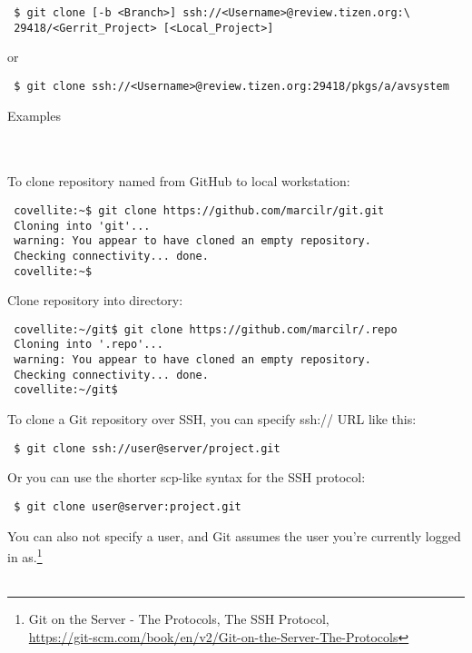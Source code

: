 \begin{Verbatim}
 $ git clone [-b <Branch>] ssh://<Username>@review.tizen.org:\
 29418/<Gerrit_Project> [<Local_Project>]
\end{Verbatim}

or

\begin{Verbatim}
 $ git clone ssh://<Username>@review.tizen.org:29418/pkgs/a/avsystem
\end{Verbatim}

\vspace{20pt}
\noindent\begin{bf}Examples\end{bf}
\\
\\
To clone repository named  from GitHub to local  workstation:
\begin{Verbatim}
 covellite:~$ git clone https://github.com/marcilr/git.git
 Cloning into 'git'...
 warning: You appear to have cloned an empty repository.
 Checking connectivity... done.
 covellite:~$
\end{Verbatim}

\noindent Clone  repository into  directory:
\begin{Verbatim}
 covellite:~/git$ git clone https://github.com/marcilr/.repo
 Cloning into '.repo'...
 warning: You appear to have cloned an empty repository.
 Checking connectivity... done.
 covellite:~/git$
\end{Verbatim}

\noindent To clone a Git repository over SSH, you can specify ssh:// URL like this:\\
\begin{Verbatim}
 $ git clone ssh://user@server/project.git
\end{Verbatim}

\noindent Or you can use the shorter scp-like syntax for the SSH protocol:

\begin{Verbatim}
 $ git clone user@server:project.git
\end{Verbatim}

\noindent You can also not specify a user, and Git assumes the user
you're currently logged in as.\footnote{
Git on the Server - The Protocols, The SSH Protocol,\\
\href{https://git-scm.com/book/en/v2/Git-on-the-Server-The-Protocols}{https://git-scm.com/book/en/v2/Git-on-the-Server-The-Protocols}}
\\
\\
\noindent {}
